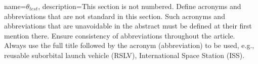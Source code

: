



{
        name=$\theta_{test}$, 
        description={This section is not numbered. Define acronyms and abbreviations that are not standard in this section. Such acronyms and abbreviations that are unavoidable in the abstract must be defined at their first mention there. Ensure consistency of abbreviations throughout the article. Always use the full title followed by the acronym (abbreviation) to be used, e.g., reusable suborbital launch vehicle (RSLV), International Space Station (ISS).}
}